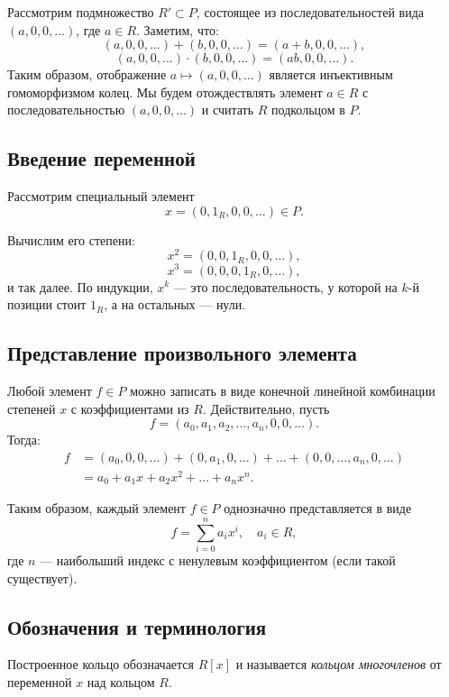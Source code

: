\documentclass[a4paper,12pt]{article}
\theoremstyle{definition}
\theoremstyle{plain}
\theoremstyle{remark}
\begin{document}
	Рассмотрим подмножество \( R' \subset P \), состоящее из последовательностей вида \( (a, 0, 0, \dots) \), где \( a \in R \).
	Заметим, что:
	\[
	(a, 0, 0, \dots) + (b, 0, 0, \dots) = (a+b, 0, 0, \dots),
	\]
	\[
	(a, 0, 0, \dots) \cdot (b, 0, 0, \dots) = (ab, 0, 0, \dots).
	\]
	Таким образом, отображение \( a \mapsto (a, 0, 0, \dots) \) является инъективным гомоморфизмом колец. Мы будем отождествлять элемент \( a \in R \) с последовательностью \( (a, 0, 0, \dots) \) и считать \( R \) подкольцом в \( P \).
	
	\subsection{Введение переменной}
	
	Рассмотрим специальный элемент
	\[
	x = (0, 1_R, 0, 0, \dots) \in P.
	\]
	
	Вычислим его степени:
	\[
	x^2 = (0, 0, 1_R, 0, 0, \dots),
	\]
	\[
	x^3 = (0, 0, 0, 1_R, 0, \dots),
	\]
	и так далее. По индукции, \( x^k \) — это последовательность, у которой на \( k \)-й позиции стоит \( 1_R \), а на остальных — нули.
	
	\subsection{Представление произвольного элемента}
	
	Любой элемент \( f \in P \) можно записать в виде конечной линейной комбинации степеней \( x \) с коэффициентами из \( R \). Действительно, пусть
	\[
	f = (a_0, a_1, a_2, \dots, a_n, 0, 0, \dots).
	\]
	Тогда:
	\[
	\begin{aligned}
		f &= (a_0, 0, 0, \dots) + (0, a_1, 0, \dots) + \dots + (0, 0, \dots, a_n, 0, \dots) \\
		&= a_0 + a_1 x + a_2 x^2 + \dots + a_n x^n.
	\end{aligned}
	\]
	
	Таким образом, каждый элемент \( f \in P \) однозначно представляется в виде
	\[
	f = \sum_{i=0}^{n} a_i x^i, \quad a_i \in R,
	\]
	где \( n \) — наибольший индекс с ненулевым коэффициентом (если такой существует).
	
	\subsection{Обозначения и терминология}
	
	Построенное кольцо обозначается \( R[x] \) и называется \textit{кольцом многочленов} от переменной \( x \) над кольцом \( R \).
	
\end{document}

